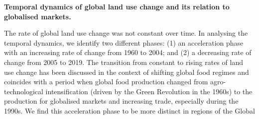 \documentclass[
]{book}
\begin{document}
\textbf{Temporal dynamics of global land use change and its relation
to globalised markets.}

The rate of global land use change was not
constant over time. In analysing the temporal dynamics, we
identify two different phases: (1) an acceleration phase with an
increasing rate of change from 1960 to 2004; and (2) a decreasing
rate of change from 2005 to 2019. The transition from
constant to rising rates of land use change has been discussed in
the context of shifting global food regimes and coincides with a
period when global food production changed from agro-
technological intensification (driven by the Green Revolution in
the 1960s) to the production for globalised markets and
increasing trade, especially during the 1990s. We find this
acceleration phase to be more distinct in regions of the Global
\end{document}
